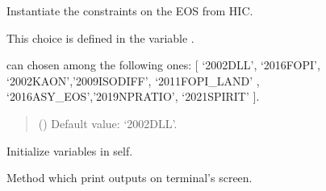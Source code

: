 \documentclass[letterpaper,10pt,english]{sphinxmanual}
\begin{document}
\begin{fulllineitems}
\label{\detokenize{source/api/setup_matter_hic:nucleardatapy.matter.setup_hic.setupHIC}}
\pysigstartsignatures
{}
\pysigstopsignatures
\sphinxAtStartPar
Instantiate the constraints on the EOS from HIC.

\sphinxAtStartPar
This choice is defined in the variable .

\sphinxAtStartPar
{} can chosen among the following ones:
{[} ‘2002\sphinxhyphen{}DLL’, ‘2016\sphinxhyphen{}FOPI’, ‘2002\sphinxhyphen{}KAON’,’2009\sphinxhyphen{}ISO\sphinxhyphen{}DIFF’, ‘2011\sphinxhyphen{}FOPI\_LAND’
, ‘2016\sphinxhyphen{}ASY\_EOS’,’2019\sphinxhyphen{}NP\sphinxhyphen{}RATIO’, ‘2021\sphinxhyphen{}SPIRIT’ {]}.
\begin{quote}\begin{description}
\sphinxAtStartPar
{} (\sphinxstyleliteralemphasis{\sphinxupquote{, }}) \textendash{} Default value: ‘2002\sphinxhyphen{}DLL’.

\end{description}\end{quote}

\sphinxAtStartPar
{}

\begin{fulllineitems}
\label{\detokenize{source/api/setup_matter_hic:nucleardatapy.matter.setup_hic.setupHIC.init_self}}
\pysigstartsignatures
{}
\pysigstopsignatures
\sphinxAtStartPar
Initialize variables in self.

\end{fulllineitems}


\begin{fulllineitems}
\label{\detokenize{source/api/setup_matter_hic:nucleardatapy.matter.setup_hic.setupHIC.print_outputs}}
\pysigstartsignatures
{}
\pysigstopsignatures
\sphinxAtStartPar
Method which print outputs on terminal’s screen.

\end{fulllineitems}


\end{fulllineitems}
\end{document}
